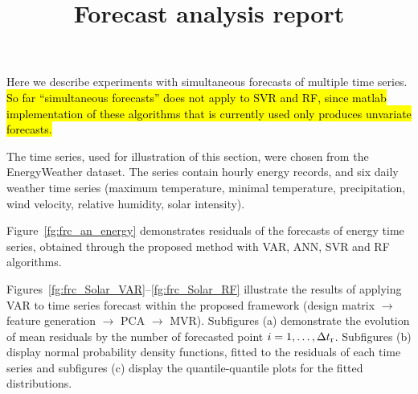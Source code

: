 \documentclass[conference]{IEEEtran}
\begin{document}
\title{Forecast analysis report}


Here we describe experiments with simultaneous forecasts of multiple time series. \hl{So far ``simultaneous forecasts'' does not apply to SVR and RF, since matlab implementation of these algorithms that is currently used only produces unvariate forecasts.}

The time series, used for illustration of this section, were chosen from the EnergyWeather dataset. The series contain hourly energy records, and six daily weather time series (maximum temperature, minimal temperature, precipitation,  wind velocity, relative humidity, solar intensity). 

Figure~\ref{fg:frc_an_energy} demonstrates residuals of the forecasts of energy time series, obtained through the proposed method with VAR, ANN, SVR and RF algorithms.  

Figures~\ref{fg:frc_Solar_VAR}--\ref{fg:frc_Solar_RF} illustrate the results of applying VAR to time series forecast within the proposed framework (design matrix $\rightarrow$ feature generation $\rightarrow$ PCA $\rightarrow$ MVR). Subfigures (a) demonstrate the evolution of mean residuals by the number of forecasted point $i = 1, \dots, \Delta t_\text{r}$. Subfigures (b) display normal probability density functions, fitted to the residuals of each time series and subfigures (c) display the quantile-quantile plots for the fitted distributions. 
\end{document}
